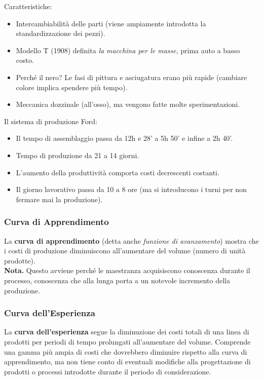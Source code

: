 \documentclass[a4paper,portrait,12pt]{article}
\theoremstyle{definition}
\begin{document}
Caratteristiche:
\begin{itemize}
\item Intercambiabilità delle parti (viene ampiamente introdotta la standardizzazione dei pezzi).
\item Modello T (1908) definita \emph{la macchina per le masse}, prima auto a basso costo.
\item Perché il nero? Le fasi di pittura e asciugatura erano più rapide (cambiare colore implica spendere più tempo).
\item Meccanica dozzinale (all'osso), ma vengono fatte molte sperimentazioni.
\end{itemize}

\noindent
Il sistema di produzione Ford:
\begin{itemize}
\item Il tempo di assemblaggio passa da 12h e 28' a 5h 50' e infine a 2h 40'.
\item Tempo di produzione da 21 a 14 giorni.
\item L'aumento della produttività comporta costi decrescenti costanti.
\item Il giorno lavorativo passa da 10 a 8 ore (ma si introducono i turni per non fermare mai la produzione).
\end{itemize}

\subsubsection{Curva di Apprendimento}
La \textbf{curva di apprendimento} (detta anche \emph{funzione di avanzamento}) mostra che i costi di produzione diminuiscono all'aumentare del volume (numero di unità prodotte).\\

\textbf{Nota.} Questo avviene perché le maestranza acquisiscono conoscenza durante il processo, conoscenza che alla lunga porta a un notevole incremento della produzione. 

\subsubsection{Curva dell'Esperienza}
La \textbf{curva dell'esperienza} segue la diminuzione dei costi totali di una linea di prodotti per periodi di tempo prolungati all'aumentare del volume.
Comprende una gamma più ampia di costi che dovrebbero diminuire rispetto alla curva di apprendimento, ma non tiene conto di eventuali modifiche alla progettazione di prodotti o processi introdotte durante il periodo di considerazione.\\
\end{document}
